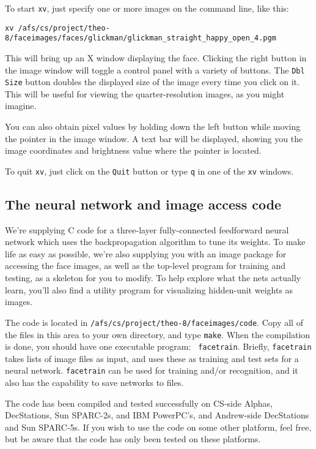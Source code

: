 To start {\tt xv}, just specify one or more images on the command line,
like this:

{\tt xv /afs/cs/project/theo-8/faceimages/faces/glickman/glickman\_straight\_happy\_open\_4.pgm}

This will bring up an X window displaying the face.  Clicking the right button
in the image window will toggle a control panel with a variety of buttons.
The {\tt Dbl Size} button doubles the displayed size of the image every time
you click on it.  This will be useful for viewing the quarter-resolution
images, as you might imagine.

You can also obtain pixel values by holding down the left button while moving
the pointer in the image window.  A text bar will be displayed, showing you
the image coordinates and brightness value where the pointer is located.

To quit {\tt xv}, just click on the {\tt Quit} button or type {\tt q}
in one of the {\tt xv} windows.

\subsection{The neural network and image access code}

We're supplying C code for a three-layer fully-connected feedforward
neural network which uses the backpropagation algorithm to tune its weights.
To make life as easy as possible, we're also supplying you with an image
package for accessing the face images, as well as the top-level
program for training and testing, as a skeleton for you to modify.
To help explore what the nets actually learn, you'll also find a
utility program for visualizing hidden-unit weights as images.

The code is located in {\tt /afs/cs/project/theo-8/faceimages/code}.  Copy all
of the files in this area to your own directory, and type {\tt make}.  When
the compilation is done, you should have one executable program: {\tt
facetrain}.  Briefly, {\tt facetrain} takes lists of image files as input, and
uses these as training and test sets for a neural network.  {\tt facetrain}
can be used for training and/or recognition, and it also has the capability to
save networks to files.

The code has been compiled and tested successfully on CS-side Alphas,
DecStations, Sun SPARC-2s, and IBM PowerPC's, and Andrew-side DecStations and
Sun SPARC-5s.  If you wish to use the code on some other platform, feel free,
but be aware that the code has only been tested on these platforms.  

